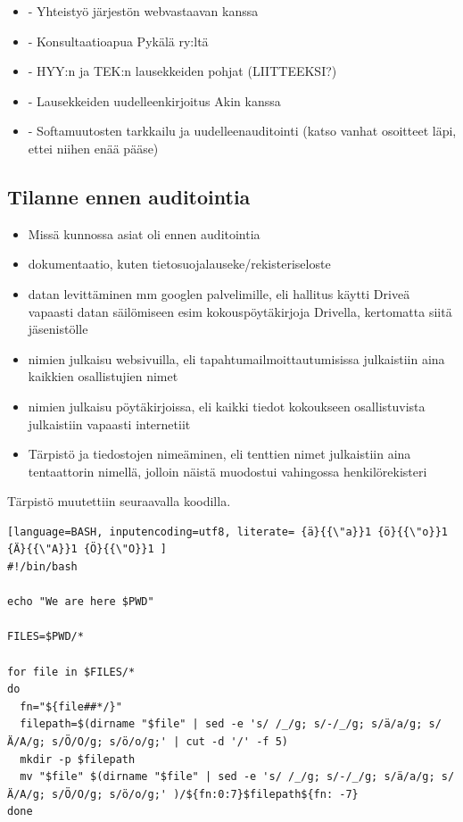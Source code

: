 \documentclass[finnish]{tktltiki}
\begin{document}
\begin{itemize}
\item - Yhteistyö järjestön webvastaavan kanssa 
\item- Konsultaatioapua Pykälä ry:ltä
\item- HYY:n ja TEK:n lausekkeiden pohjat (LIITTEEKSI?)
\item- Lausekkeiden uudelleenkirjoitus Akin kanssa
\item- Softamuutosten tarkkailu ja uudelleenauditointi (katso vanhat osoitteet läpi, ettei niihen enää pääse)
\end{itemize}

\subsection{Tilanne ennen auditointia}

\begin{itemize}
\item Missä kunnossa asiat oli ennen auditointia
\item dokumentaatio, kuten tietosuojalauseke/rekisteriseloste
\item  datan levittäminen mm googlen palvelimille, eli hallitus käytti Driveä vapaasti datan säilömiseen esim kokouspöytäkirjoja Drivella, kertomatta siitä jäsenistölle
\item  nimien julkaisu websivuilla, eli tapahtumailmoittautumisissa julkaistiin aina kaikkien osallistujien nimet
\item  nimien julkaisu pöytäkirjoissa, eli kaikki tiedot kokoukseen osallistuvista julkaistiin vapaasti internetiit
\item Tärpistö ja tiedostojen nimeäminen, eli tenttien nimet julkaistiin aina tentaattorin nimellä, jolloin näistä muodostui vahingossa henkilörekisteri
\end{itemize}



Tärpistö muutettiin seuraavalla koodilla.

\begin{lstlisting}[language=BASH, inputencoding=utf8, literate= {ä}{{\"a}}1 {ö}{{\"o}}1  {Ä}{{\"A}}1 {Ö}{{\"O}}1 ]
#!/bin/bash

echo "We are here $PWD"

FILES=$PWD/*

for file in $FILES/*
do
  fn="${file##*/}"
  filepath=$(dirname "$file" | sed -e 's/ /_/g; s/-/_/g; s/ä/a/g; s/Ä/A/g; s/Ö/O/g; s/ö/o/g;' | cut -d '/' -f 5)
  mkdir -p $filepath
  mv "$file" $(dirname "$file" | sed -e 's/ /_/g; s/-/_/g; s/ä/a/g; s/Ä/A/g; s/Ö/O/g; s/ö/o/g;' )/${fn:0:7}$filepath${fn: -7}
done
\end{lstlisting}
\end{document}

